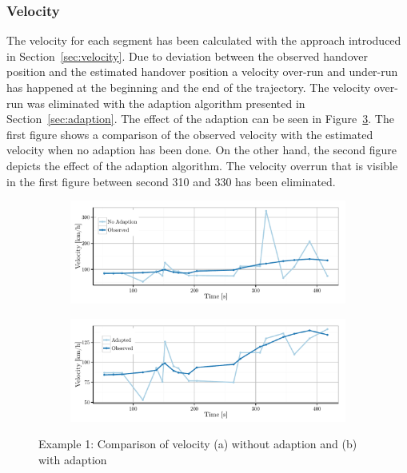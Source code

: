 \documentclass[master,english]{hgbthesis}
\begin{document}
\subsubsection{Velocity}
The velocity for each segment has been calculated with the approach introduced in Section~\ref{sec:velocity}. Due to deviation between the observed handover position and the estimated handover position a velocity over-run and under-run has happened at the beginning and the end of the trajectory. The velocity over-run was eliminated with the adaption algorithm presented in Section~\ref{sec:adaption}. The effect of the adaption can be seen in Figure~\ref{fig:563velocity}. The first figure shows a comparison of the observed velocity with the estimated velocity when no adaption has been done. On the other hand, the second figure depicts the effect of the adaption algorithm. The velocity overrun that is visible in the first figure between second 310 and 330 has been eliminated.
\begin{figure}
	\centering
	\begin{subfigure}[b]{\textwidth}
		\includegraphics[width=\textwidth]{./images/563_velocityNoAdapt}
		\caption{}
		\label{fig:563_velocityNoAdapt}
	\end{subfigure}%
	\begin{subfigure}[b]{\textwidth}
		\includegraphics[width=\textwidth]{./images/563_velocityAdapt}
		\caption{}
		\label{fig:563_velocityAdapt}
	\end{subfigure}
	\caption{Example 1: Comparison of velocity (a) without adaption  and (b) with adaption}\label{fig:563velocity}
\end{figure}
\end{document}
